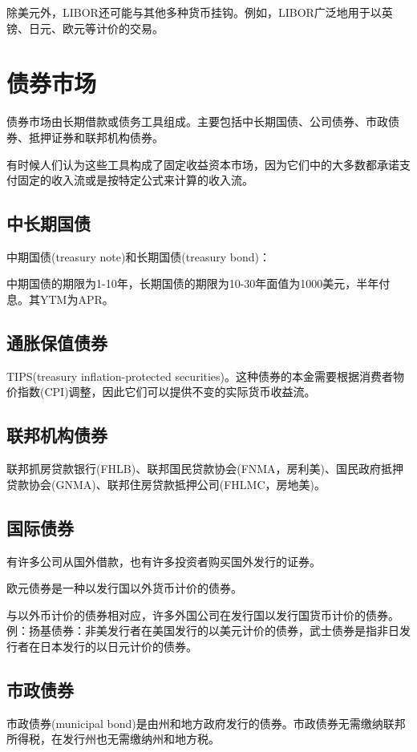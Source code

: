 \documentclass{article}
\begin{document}
除美元外，LIBOR还可能与其他多种货币挂钩。例如，LIBOR广泛地用于以英镑、日元、欧元等计价的交易。

\section{债券市场}
债券市场由长期借款或债务工具组成。主要包括中长期国债、公司债券、市政债券、抵押证券和联邦机构债券。

有时候人们认为这些工具构成了固定收益资本市场，因为它们中的大多数都承诺支付固定的收入流或是按特定公式来计算的收入流。

\subsection{中长期国债}
中期国债(treasury note)和长期国债(treasury bond)：

中期国债的期限为1-10年，长期国债的期限为10-30年面值为1000美元，半年付息。其YTM为APR。

\subsection{通胀保值债券}
TIPS(treasury inflation-protected securities)。这种债券的本金需要根据消费者物价指数(CPI)调整，因此它们可以提供不变的实际货币收益流。

\subsection{联邦机构债券}
联邦抓房贷款银行(FHLB)、联邦国民贷款协会(FNMA，房利美)、国民政府抵押贷款协会(GNMA)、联邦住房贷款抵押公司(FHLMC，房地美)。

\subsection{国际债券}
有许多公司从国外借款，也有许多投资者购买国外发行的证券。

欧元债券是一种以发行国以外货币计价的债券。

与以外币计价的债券相对应，许多外国公司在发行国以发行国货币计价的债券。例：扬基债券：非美发行者在美国发行的以美元计价的债券，武士债券是指非日发行者在日本发行的以日元计价的债券。

\subsection{市政债券}
市政债券(municipal bond)是由州和地方政府发行的债券。市政债券无需缴纳联邦所得税，在发行州也无需缴纳州和地方税。
\end{document}
